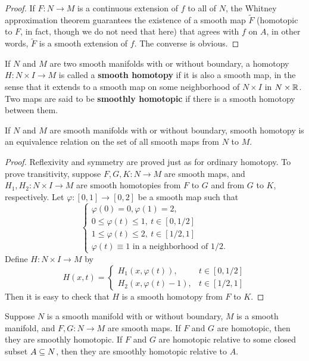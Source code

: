 \begin{proof}
If $F:N\to M$ is a continuous extension of $f$ to all of $N$, the Whitney approximation theorem guarantees the existence of a smooth map $\widetilde{F}$ (homotopic to $F$, in fact, though we do not need that here) that agrees with $f$ on $A$, in other words, $\widetilde{F}$ is a smooth extension of $f$. The converse is obvious.
\end{proof}
If $N$ and $M$ are two smooth manifolds with or without boundary, a homotopy $H:N\times I\to M$ is called a \textbf{smooth homotopy} if it is also a smooth map, in the sense that it extends to a smooth map on some neighborhood of $N\times I$ in $N\times\mathbb{R}$. Two maps are said to be \textbf{smoothly homotopic} if there is a smooth homotopy between them.
\begin{lemma}\label{smooth homotopy trans}
If $N$ and $M$ are smooth manifolds with or without boundary, smooth homotopy is an equivalence relation on the set of all smooth maps from $N$ to $M$.
\end{lemma}
\begin{proof}
Reflexivity and symmetry are proved just as for ordinary homotopy. To prove transitivity, suppose $F,G,K:N\to M$ are smooth maps, and $H_1,H_2:N\times I\to M$ are smooth homotopies from $F$ to $G$ and from $G$ to $K$, respectively. Let $\varphi:[0,1]\to[0,2]$ be a smooth map such that 
\[\left\{\begin{array}{l}
\varphi(0)=0,\varphi(1)=2,\\
0\leq\varphi(t)\leq 1,\ t\in[0,1/2]\\
1\leq\varphi(t)\leq 2,\ t\in[1/2,1]\\
\varphi(t)\equiv 1\text{ in a neighborhood of }1/2.
\end{array}\right. \]
Define $H:N\times I\to M$ by
\[H(x,t)=\begin{cases}
H_1(x,\varphi(t)),&t\in[0,1/2]\\
H_2(x,\varphi(t)-1),&t\in[1/2,1]
\end{cases}\]
Then it is easy to check that $H$ is a smooth homotopy from $F$ to $K$.
\end{proof}
\begin{theorem}\label{homotopy to smooth}
Suppose $N$ is a smooth manifold with or without boundary, $M$ is a smooth manifold, and $F,G:N\to M$ are smooth maps. If $F$ and $G$ are homotopic, then they are smoothly homotopic. If $F$ and $G$ are homotopic relative to some closed subset $A\subseteq N$, then they are smoothly homotopic relative to $A$.
\end{theorem}
